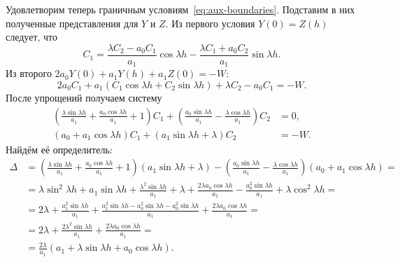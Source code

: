 \documentclass[a4paper,14pt]{article}
\theoremstyle{definition}
\begin{document}
Удовлетворим теперь граничным условиям~\eqref{eq:aux-boundaries}.
Подставим в них полученные представления для $Y$ и $Z$. Из
первого условия $Y(0) = Z(h)$ следует, что
\begin{equation*}
  C_1
  =
  \frac{\lambda C_2 - a_0 C_1}{a_1}
  \cos \lambda h
  -
  \frac{\lambda C_1 + a_0 C_2}{a_1}
  \sin \lambda h.
\end{equation*}
Из второго $2 a_0 Y(0) + a_1 Y(h) + a_1 Z(0) = -W$:
\begin{equation*}
  2 a_0 C_1
  + a_1 \left(
    C_1 \cos \lambda h + C_2 \sin \lambda h
  \right)
  + \lambda C_2 - a_0 C_1 = -W.
\end{equation*}
После упрощений получаем систему
\begin{equation*}
  \begin{aligned}
    \left(
    \frac{\lambda \sin \lambda h}{a_1}
    + \frac{a_0 \cos \lambda h}{a_1}
    + 1
    \right)
    C_1
    +
    \left(
    \frac{a_0 \sin \lambda h}{a_1}
    - \frac{\lambda \cos \lambda h}{a_1}
    \right)
    C_2
    &= 0, \\
    \left(
    a_0 + a_1 \cos \lambda h
    \right)
    C_1
    +
    \left(
    a_1 \sin \lambda h + \lambda
    \right)
    C_2
    &=
      -W.
  \end{aligned}
\end{equation*}
Найдём её определитель:
\begin{equation*}
  \begin{aligned}
    \Delta
    &=
      \left(
      \frac{\lambda \sin \lambda h}{a_1}
      + \frac{a_0 \cos \lambda h}{a_1}
      + 1
      \right)
      \left(
      a_1 \sin \lambda h + \lambda
      \right)
      -
      \left(
      \frac{a_0 \sin \lambda h}{a_1}
      - \frac{\lambda \cos \lambda h}{a_1}
      \right)
      \left(
      a_0 + a_1 \cos \lambda h
      \right)
      = \\
    &=
      \lambda \sin^2 \lambda h + a_1 \sin \lambda h
      + \frac{\lambda^2 \sin \lambda h}{a_1} + \lambda
      + \frac{2 \lambda a_0 \cos \lambda h}{a_1}
      - \frac{a_0^2 \sin \lambda h}{a_1}
      + \lambda \cos^2 \lambda h = \\
    &=
      2 \lambda
      + \frac{a_1^2 \sin \lambda h}{a_1}
      + \frac{
      a_1^2 \sin \lambda h - a_0^2 \sin \lambda h
      - a_0^2 \sin \lambda h
      }{a_1}
      + \frac{2 \lambda a_0 \cos \lambda h}{a_1} = \\
    &=
      2 \lambda
      + \frac{2 \lambda^2 \sin \lambda h}{a_1}
      + \frac{2 \lambda a_0 \cos \lambda h}{a_1} = \\
    &=
      \frac{2 \lambda}{a_1} \left(
      a_1 + \lambda \sin \lambda h + a_0 \cos \lambda h
      \right).
  \end{aligned}
\end{equation*}
\end{document}
